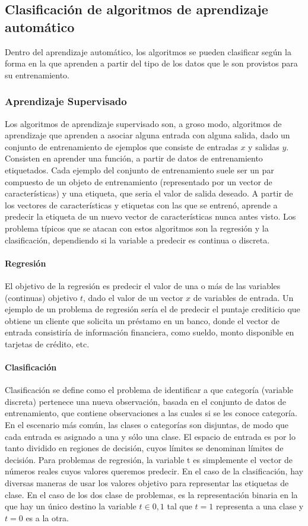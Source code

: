 \documentclass[a4paper,11pt,spanish]{book}
\begin{document}
    \subsection{Clasificación de algoritmos de aprendizaje automático}
      Dentro del aprendizaje automático, los algoritmos se pueden clasificar
      según la forma en la que aprenden a partir del tipo de los datos que le son provistos para su entrenamiento.

      \subsubsection{Aprendizaje Supervisado}
	Los algoritmos de aprendizaje supervisado son, a groso modo, algoritmos de aprendizaje que aprenden a asociar alguna entrada con alguna salida,
	dado un conjunto de entrenamiento de ejemplos que consiste de entradas $x$ y salidas $y$.
	Consisten en aprender una función, a partir de datos de entrenamiento etiquetados. Cada ejemplo del conjunto de entrenamiento suele ser un par
	compuesto de un objeto de entrenamiento (representado por un vector de características) y una etiqueta, que seria el valor de salida deseado.
	A partir de los vectores de características y etiquetas con las que se entrenó, aprende a predecir la etiqueta de un nuevo vector de características nunca antes visto.
	Los problema típicos que se atacan con estos algoritmos son la regresión y la clasificación, dependiendo si la variable a predecir es continua o discreta.

	\paragraph {Regresión}
	  El objetivo de la regresión es predecir el valor de una o más de las variables (continuas) objetivo $t$, dado el valor de un vector $x$ de variables de entrada.
	  Un ejemplo de un problema de regresión sería el de predecir el puntaje crediticio que obtiene un cliente que solicita un préstamo en un banco, donde el vector de entrada
	  consistiría de información financiera, como sueldo, monto disponible en tarjetas de crédito, etc.

	\paragraph {Clasificación}
	  Clasificación se define como el problema de identificar a que categoría (variable discreta) pertenece una nueva observación, basada en el conjunto de datos de entrenamiento,
	  que contiene observaciones a las cuales  si se les conoce categoría. En el escenario más común, las clases o categorías son disjuntas,
	  de modo que cada entrada es asignado a una y sólo una clase. El espacio de entrada es por lo tanto dividido en regiones de decisión, cuyos límites se denominan límites de decisión.
	  Para problemas de regresión, la variable t es simplemente el vector de números reales cuyos valores queremos predecir. En el caso de la clasificación,
	  hay diversas maneras de usar los valores objetivo para representar las etiquetas de clase. En el caso de los dos clase de problemas, es la representación binaria
	  en la que hay un único destino la variable $t \in {0, 1}$ tal que $t = 1$ representa a una clase y $t = 0$ es a la otra.
\end{document}
